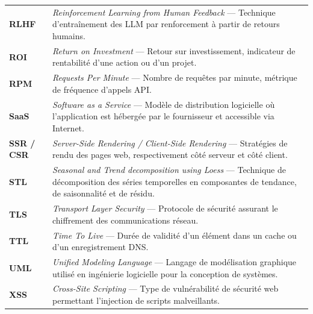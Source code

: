 \begin{longtable}{p{3.5cm} p{11cm}}
\textbf{RLHF} & \textit{Reinforcement Learning from Human Feedback} --- Technique d'entraînement des LLM par renforcement à partir de retours humains. \\[6pt]

\textbf{ROI} & \textit{Return on Investment} --- Retour sur investissement, indicateur de rentabilité d'une action ou d'un projet. \\[6pt]

\textbf{RPM} & \textit{Requests Per Minute} --- Nombre de requêtes par minute, métrique de fréquence d'appels API. \\[6pt]

\textbf{SaaS} & \textit{Software as a Service} --- Modèle de distribution logicielle où l'application est hébergée par le fournisseur et accessible via Internet. \\[6pt]

\textbf{SSR / CSR} & \textit{Server-Side Rendering / Client-Side Rendering} --- Stratégies de rendu des pages web, respectivement côté serveur et côté client. \\[6pt]

\textbf{STL} & \textit{Seasonal and Trend decomposition using Loess} --- Technique de décomposition des séries temporelles en composantes de tendance, de saisonnalité et de résidu. \\[6pt]

\textbf{TLS} & \textit{Transport Layer Security} --- Protocole de sécurité assurant le chiffrement des communications réseau. \\[6pt]

\textbf{TTL} & \textit{Time To Live} --- Durée de validité d'un élément dans un cache ou d'un enregistrement DNS. \\[6pt]

\textbf{UML} & \textit{Unified Modeling Language} --- Langage de modélisation graphique utilisé en ingénierie logicielle pour la conception de systèmes. \\[6pt]

\textbf{XSS} & \textit{Cross-Site Scripting} --- Type de vulnérabilité de sécurité web permettant l'injection de scripts malveillants. \\[6pt]

\end{longtable}

